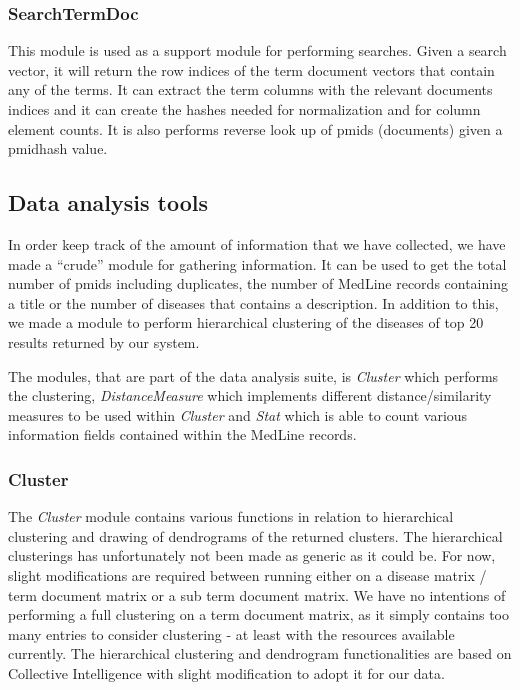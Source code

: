 \subsubsection{SearchTermDoc}
This module is used as a support module for performing searches. Given
a search vector, it will return the row indices of the term document
vectors that contain any of the terms. It can extract the term columns
with the relevant documents indices and it can create the hashes
needed for normalization and for column element counts. It is also
performs reverse look up of pmids (documents) given a pmidhash value.

\subsection{Data analysis tools}

In order keep track of the amount of information that we have
collected, we have made a ``crude'' module for gathering information. It
can be used to get the total number of pmids including duplicates, the
number of MedLine records containing a title or the number of diseases
that contains a description. In addition to this, we made a module to
perform hierarchical clustering of the diseases of top 20 results
returned by our system.

The modules, that are part of the data analysis suite, is
\textit{Cluster} which performs the clustering,
\textit{DistanceMeasure} which implements different
distance/similarity measures to be used within \textit{Cluster} and
\textit{Stat} which is able to count various information fields
contained within the MedLine records.

\subsubsection{Cluster}
The \textit{Cluster} module contains various functions in relation to
hierarchical clustering and drawing of dendrograms of the returned
clusters. The hierarchical clusterings has unfortunately not been made
as generic as it could be. For now, slight modifications are required
between running either on a disease matrix / term document matrix or a
sub term document matrix. We have no intentions of performing a full
clustering on a term document matrix, as it simply contains too many
entries to consider clustering - at least with the resources available
currently. The hierarchical clustering and dendrogram functionalities
are based on Collective Intelligence \cite{CollectiveIntelligence}
with slight modification to adopt it for our data.

